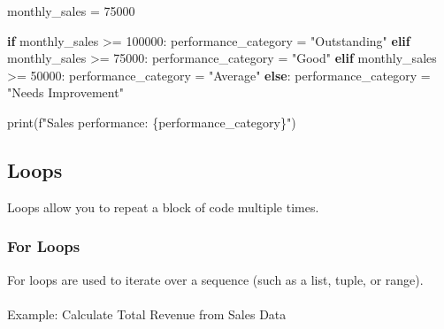 \documentclass[
  letterpaper,
  DIV=11,
  numbers=noendperiod]{scrreprt}
\makeatletter
\let\oldparagraph\paragraph
\renewcommand{\paragraph}{
    \@ifstar
      \xxxParagraphStar
      \xxxParagraphNoStar
  }
\newcommand{\xxxParagraphStar}[1]{\oldparagraph*{#1}\mbox{}}
\newcommand{\xxxParagraphNoStar}[1]{\oldparagraph{#1}\mbox{}}
\newenvironment{Shaded}{\begin{snugshade}}{\end{snugshade}}
\newcommand{\BuiltInTok}[1]{\textcolor[rgb]{0.00,0.23,0.31}{#1}}
\newcommand{\ControlFlowTok}[1]{\textcolor[rgb]{0.00,0.23,0.31}{\textbf{#1}}}
\newcommand{\DecValTok}[1]{\textcolor[rgb]{0.68,0.00,0.00}{#1}}
\newcommand{\KeywordTok}[1]{\textcolor[rgb]{0.00,0.23,0.31}{\textbf{#1}}}
\newcommand{\NormalTok}[1]{\textcolor[rgb]{0.00,0.23,0.31}{#1}}
\newcommand{\OperatorTok}[1]{\textcolor[rgb]{0.37,0.37,0.37}{#1}}
\newcommand{\SpecialCharTok}[1]{\textcolor[rgb]{0.37,0.37,0.37}{#1}}
\newcommand{\SpecialStringTok}[1]{\textcolor[rgb]{0.13,0.47,0.30}{#1}}
\newcommand{\StringTok}[1]{\textcolor[rgb]{0.13,0.47,0.30}{#1}}
\makeatother
\begin{document}
\begin{Shaded}
\begin{Highlighting}[]
\NormalTok{monthly\_sales }\OperatorTok{=} \DecValTok{75000}

\ControlFlowTok{if}\NormalTok{ monthly\_sales }\OperatorTok{\textgreater{}=} \DecValTok{100000}\NormalTok{:}
\NormalTok{    performance\_category }\OperatorTok{=} \StringTok{"Outstanding"}
\ControlFlowTok{elif}\NormalTok{ monthly\_sales }\OperatorTok{\textgreater{}=} \DecValTok{75000}\NormalTok{:}
\NormalTok{    performance\_category }\OperatorTok{=} \StringTok{"Good"}
\ControlFlowTok{elif}\NormalTok{ monthly\_sales }\OperatorTok{\textgreater{}=} \DecValTok{50000}\NormalTok{:}
\NormalTok{    performance\_category }\OperatorTok{=} \StringTok{"Average"}
\ControlFlowTok{else}\NormalTok{:}
\NormalTok{    performance\_category }\OperatorTok{=} \StringTok{"Needs Improvement"}

\BuiltInTok{print}\NormalTok{(}\SpecialStringTok{f"Sales performance: }\SpecialCharTok{\{}\NormalTok{performance\_category}\SpecialCharTok{\}}\SpecialStringTok{"}\NormalTok{)}
\end{Highlighting}
\end{Shaded}

\subsection{Loops}\label{loops-2}

Loops allow you to repeat a block of code multiple times.

\subsubsection{For Loops}\label{for-loops}

For loops are used to iterate over a sequence (such as a list, tuple, or
range).

\paragraph{Example: Calculate Total Revenue from Sales
Data}\label{example-calculate-total-revenue-from-sales-data}

\begin{Shaded}
\end{Shaded}
\end{document}
